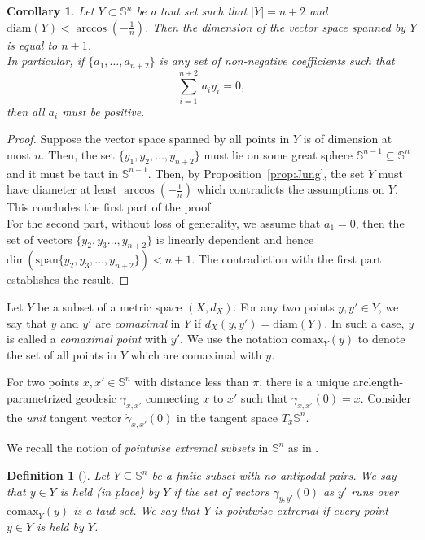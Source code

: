 \documentclass[12pt]{amsart}
\theoremstyle{plain}
\newtheorem{corollary}[theorem]{Corollary}
\newtheorem{definition}[theorem]{Definition}
\newcommand{\Sp}{\mathbb{S}}
\newcommand{\diam}{\mathrm{diam}}
\newcommand{\comax}{\mathrm{comax}}
\numberwithin{equation}{section}
\begin{document}
	\begin{corollary}\label{coro:taut_positive_coeff}
Let $Y \subset \Sp^n$ be a taut set such that $|Y|=n+2$ and
$\diam(Y)<\arccos\left(-\frac{1}{n}\right)$.  Then the dimension of
the vector space spanned by $Y$ is equal to $n+1$.\\ In particular, if
$\{a_1,\ldots,a_{n+2}\}$ is any set of non-negative coefficients such
that
		\[
	\sum_{i=1}^{n+2}\,{a_i y_i} = 0,
		\]
		then all $a_i$ must be positive.
	\end{corollary}
	\begin{proof}
%
Suppose the vector space spanned by all points in $Y$ is of dimension
at most $n$. Then, the set $\{y_1, y_2, \ldots, y_{n+2}\}$ must lie on
some great sphere $\Sp^{n-1}\subseteq\Sp^n$ and it must be taut in
$\Sp^{n-1}$.  Then, by Proposition~\ref{prop:Jung}, the set $Y$ must
have diameter at least $\arccos\left(-\frac{1}{n}\right)$ which
contradicts the assumptions on $Y$. This concludes the first part of
the proof.\\ For the second part, without loss of generality, we
assume that $a_1 = 0$, then the set of vectors $\{y_2, y_3 \ldots,
y_{n+2}\}$ is linearly dependent and hence
$\mathrm{dim}(\mathrm{span}\{y_2, y_3, \ldots, y_{n+2}\}) < n+1$.  The
contradiction with the first part establishes the result.
	\end{proof}




Let $Y$ be a subset of a metric space $(X, d_X)$.  For any two points
$y, y'\in Y$, we say that $y$ and $y'$ are \emph{comaximal} in $Y$ if
$d_X(y, y') = \diam(Y)$.  In such a case, $y$ is called a
\emph{comaximal point} with $y'$.  We use the notation
$\comax_Y^{\phantom{I}}(y)$ to denote the set of all points in $Y$
which are comaximal with $y$.

For two points $x, x'\in \Sp^n$ with distance less than $\pi$, there
is a unique arclength-parametrized geodesic $\gamma_{x,x'}$ connecting
$x$ to $x'$ such that $\gamma_{x,x'}(0)=x$.  Consider the \emph{unit}
tangent vector $\dot{\gamma}_{x,x'}(0)$ in the tangent space
$T_x\Sp^n$.

We recall the notion of \emph{pointwise extremal subsets} in $\Sp^n$
as in \cite{katz1989diameter}.


\begin{definition}[\cite{katz1989diameter}]\label{defn:pointwise_extremal}
Let $Y\subseteq\Sp^n$ be a \emph{finite} subset with no antipodal
pairs.  We say that $y\in Y$ is \emph{held} (in place) by $Y$ if the
set of vectors $\dot{\gamma}_{y,y'}(0)$ as $y'$ runs over
$\comax_Y^{\phantom{I}}(y)$ is a taut set.  We say that $Y$ is
\emph{pointwise extremal} if every point $y\in Y$ is held by $Y$.
\end{definition}
\end{document}
